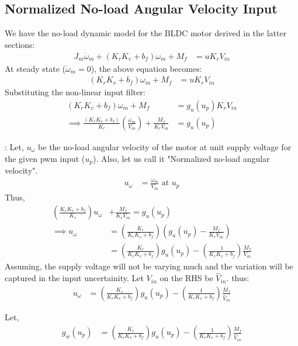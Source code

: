 \subsection{Normalized No-load Angular Velocity Input}

We have the no-load dynamic model for the BLDC motor derived in the latter sections:
\begin{align*}
    J_m \dot \omega_m + (K_r K_v  + b_f) \omega_m + M_f &= u K_r V_{in}
\end{align*}
At steady state ($\dot \omega_m = 0$), the above equation becomes:
\begin{align*}
    (K_r K_v  + b_f) \omega_m + M_f &= u K_r V_{in}
\end{align*}
Substituting the non-linear input filter:
\begin{align*}
    (K_r K_v  + b_f) \omega_m + M_f &= g_u(u_p) K_r V_{in}\\
    \implies \frac{(K_r K_v  + b_f)}{K_r} \left(\frac{\omega_m}{V_{in}}\right) + \frac{M_f}{K_r V_{in}} &= g_u(u_p)
\end{align*}

: Let, $u_{\omega}$ be the no-load angular velocity of the motor at unit supply voltage for the given pwm input ($u_p$). Also, let us call it "Normalized no-load angular velocity".
\begin{align*}
    u_{\omega} &= \frac{\omega_m}{V_{in}} \text{  at  } u_p
\end{align*}
Thus,
\begin{align*}
    \left(\frac{K_r K_v  + b_f}{K_r} \right) u_{\omega} &+ \frac{M_f}{K_r V_{in}} = g_u(u_p)\\
    \implies u_{\omega} &= \left(\frac{K_r}{K_r K_v  + b_f} \right) \left( g_u(u_p) - \frac{M_f}{K_r V_{in}} \right)\\
    &= \left(\frac{K_r}{K_r K_v  + b_f} \right) g_u(u_p) - \left(\frac{1}{K_r K_v  + b_f} \right) \frac{M_f}{V_{in}}
\end{align*}
Assuming, the supply voltage will not be varying much and the variation will be captured in the input uncertainity. Let $V_{in}$ on the RHS be $\hat V_{in}$. thus:
\begin{align*}
    u_{\omega} &= \left(\frac{K_r}{K_r K_v  + b_f} \right) g_u(u_p) - \left(\frac{1}{K_r K_v  + b_f} \right) \frac{M_f}{\hat V_{in}}
\end{align*}

Let,
\begin{align*}
    g_w (u_p) &= \left(\frac{K_r}{K_r K_v  + b_f} \right) g_u(u_p) - \left(\frac{1}{K_r K_v  + b_f} \right) \frac{M_f}{\hat V_{in}}
\end{align*}

